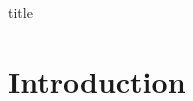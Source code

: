 \documentclass[a4paper,11pt]{article}
\begin{document}
{title}

\section*{Introduction}


\end{document}
